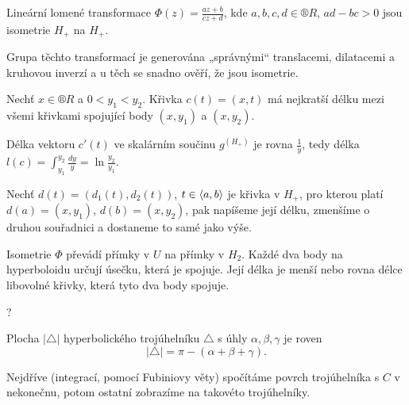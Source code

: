 \documentclass[12pt]{article}                   %
\begin{document}
        \begin{tvrzeni}
            Lineární lomené transformace $\Phi(z) = \frac{az + b}{cz + d}$, kde $a, b, c, d \in ®R$, $ad - bc > 0$ jsou isometrie $H_+$ na $H_+$.

            \begin{dukazin}
                Grupa těchto transformací je generována „správnými“ translacemi, dilatacemi a kruhovou inverzí a u těch se snadno ověří, že jsou isometrie.
            \end{dukazin}
        \end{tvrzeni}

        \begin{lemma}
            Nechť $x \in ®R$ a $0 < y_1 < y_2$. Křivka $c(t) = (x, t)$ má nejkratší délku mezi všemi křivkami spojující body $(x, y_1)$ a $(x, y_2)$.
            \begin{dukazin}
                Délka vektoru $c'(t)$ ve skalárním součinu $g^{(H_+)}$ je rovna $\frac{1}{y}$, tedy délka $l(c) = \int_{y_1}^{y_2}\frac{dy}{y} = \ln \frac{y_2}{y_1}$.

                Nechť $d(t) = (d_1(t), d_2(t))$, $t \in \left\langle a, b\right\rangle$ je křivka v $H_+$, pro kterou platí $d(a) = (x, y_1)$, $d(b) = (x, y_2)$, pak napíšeme její délku, zmenšíme o druhou souřadnici a dostaneme to samé jako výše.
            \end{dukazin}
        \end{lemma}

        \begin{veta}
            Isometrie $\Phi$ převádí přímky v $U$ na přímky v $H_2$. Každé dva body na hyperboloidu určují úsečku, která je spojuje. Její délka je menší nebo rovna délce libovolné křivky, která tyto dva body spojuje.

            \begin{dukazin}
                ?
            \end{dukazin}
        \end{veta}

        \begin{veta}
            Plocha $|\triangle|$ hyperbolického trojúhelníku $\triangle$ s úhly $\alpha, \beta, \gamma$ je roven
            $$ |\triangle| = \pi - (\alpha + \beta + \gamma). $$

            \begin{dukazin}
                Nejdříve (integrací, pomocí Fubiniovy věty) spočítáme povrch trojúhelníka s $C$ v nekonečnu, potom ostatní zobrazíme na takovéto trojúhelníky.
            \end{dukazin}
        \end{veta}
\end{document}
